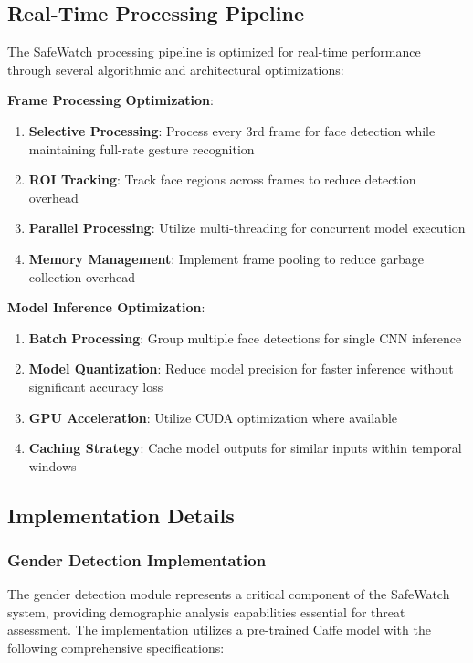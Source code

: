 \documentclass[12pt,a4paper]{article}
\begin{document}
\subsection{Real-Time Processing Pipeline}

The SafeWatch processing pipeline is optimized for real-time performance through several algorithmic and architectural optimizations:

\textbf{Frame Processing Optimization}:
\begin{enumerate}
    \item \textbf{Selective Processing}: Process every 3rd frame for face detection while maintaining full-rate gesture recognition
    \item \textbf{ROI Tracking}: Track face regions across frames to reduce detection overhead
    \item \textbf{Parallel Processing}: Utilize multi-threading for concurrent model execution
    \item \textbf{Memory Management}: Implement frame pooling to reduce garbage collection overhead
\end{enumerate}

\textbf{Model Inference Optimization}:
\begin{enumerate}
    \item \textbf{Batch Processing}: Group multiple face detections for single CNN inference
    \item \textbf{Model Quantization}: Reduce model precision for faster inference without significant accuracy loss
    \item \textbf{GPU Acceleration}: Utilize CUDA optimization where available
    \item \textbf{Caching Strategy}: Cache model outputs for similar inputs within temporal windows
\end{enumerate}

\subsection{Implementation Details}

\subsubsection{Gender Detection Implementation}
The gender detection module represents a critical component of the SafeWatch system, providing demographic analysis capabilities essential for threat assessment. The implementation utilizes a pre-trained Caffe model with the following comprehensive specifications:
\end{document}
